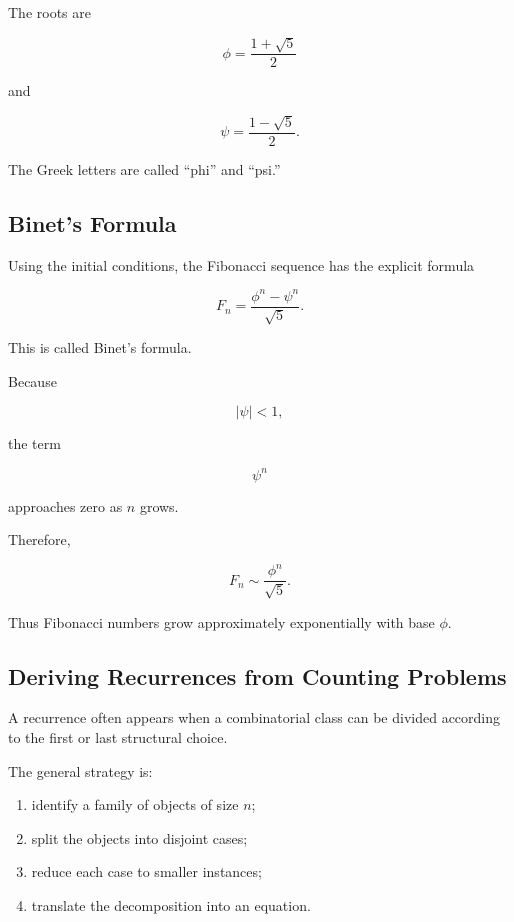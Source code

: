 The roots are

\[
\boxed{
\phi
=
\frac{1+\sqrt5}{2}
}
\]

and

\[
\boxed{
\psi
=
\frac{1-\sqrt5}{2}.
}
\]

The Greek letters are called ``phi'' and ``psi.''

\subsection{Binet's Formula}
\label{subsec:binets-formula}

Using the initial conditions, the Fibonacci sequence has the explicit
formula

\[
\boxed{
F_n
=
\frac{\phi^n-\psi^n}{\sqrt5}.
}
\]

This is called Binet's formula.

Because

\[
|\psi|<1,
\]

the term

\[
\psi^n
\]

approaches zero as \(n\) grows.

Therefore,

\[
\boxed{
F_n
\sim
\frac{\phi^n}{\sqrt5}.
}
\]

Thus Fibonacci numbers grow approximately exponentially with base
\(\phi\).

\subsection{Deriving Recurrences from Counting Problems}
\label{subsec:deriving-recurrences-counting}

A recurrence often appears when a combinatorial class can be divided
according to the first or last structural choice.

The general strategy is:

\begin{enumerate}
    \item identify a family of objects of size \(n\);
    \item split the objects into disjoint cases;
    \item reduce each case to smaller instances;
    \item translate the decomposition into an equation.
\end{enumerate}

